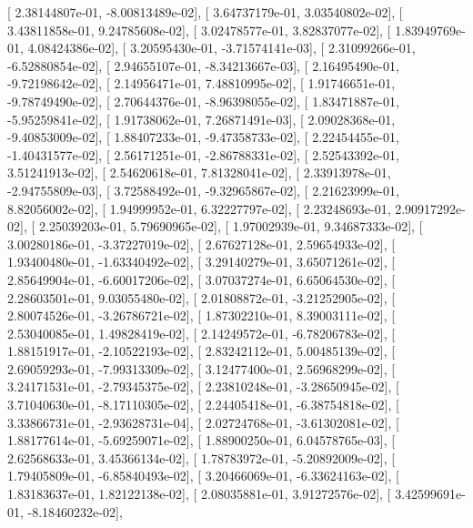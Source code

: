 \documentclass{article}
\begin{document}
       [  2.38144807e-01,  -8.00813489e-02],
       [  3.64737179e-01,   3.03540802e-02],
       [  3.43811858e-01,   9.24785608e-02],
       [  3.02478577e-01,   3.82837077e-02],
       [  1.83949769e-01,   4.08424386e-02],
       [  3.20595430e-01,  -3.71574141e-03],
       [  2.31099266e-01,  -6.52880854e-02],
       [  2.94655107e-01,  -8.34213667e-03],
       [  2.16495490e-01,  -9.72198642e-02],
       [  2.14956471e-01,   7.48810995e-02],
       [  1.91746651e-01,  -9.78749490e-02],
       [  2.70644376e-01,  -8.96398055e-02],
       [  1.83471887e-01,  -5.95259841e-02],
       [  1.91738062e-01,   7.26871491e-03],
       [  2.09028368e-01,  -9.40853009e-02],
       [  1.88407233e-01,  -9.47358733e-02],
       [  2.22454455e-01,  -1.40431577e-02],
       [  2.56171251e-01,  -2.86788331e-02],
       [  2.52543392e-01,   3.51241913e-02],
       [  2.54620618e-01,   7.81328041e-02],
       [  2.33913978e-01,  -2.94755809e-03],
       [  3.72588492e-01,  -9.32965867e-02],
       [  2.21623999e-01,   8.82056002e-02],
       [  1.94999952e-01,   6.32227797e-02],
       [  2.23248693e-01,   2.90917292e-02],
       [  2.25039203e-01,   5.79690965e-02],
       [  1.97002939e-01,   9.34687333e-02],
       [  3.00280186e-01,  -3.37227019e-02],
       [  2.67627128e-01,   2.59654933e-02],
       [  1.93400480e-01,  -1.63340492e-02],
       [  3.29140279e-01,   3.65071261e-02],
       [  2.85649904e-01,  -6.60017206e-02],
       [  3.07037274e-01,   6.65064530e-02],
       [  2.28603501e-01,   9.03055480e-02],
       [  2.01808872e-01,  -3.21252905e-02],
       [  2.80074526e-01,  -3.26786721e-02],
       [  1.87302210e-01,   8.39003111e-02],
       [  2.53040085e-01,   1.49828419e-02],
       [  2.14249572e-01,  -6.78206783e-02],
       [  1.88151917e-01,  -2.10522193e-02],
       [  2.83242112e-01,   5.00485139e-02],
       [  2.69059293e-01,  -7.99313309e-02],
       [  3.12477400e-01,   2.56968299e-02],
       [  3.24171531e-01,  -2.79345375e-02],
       [  2.23810248e-01,  -3.28650945e-02],
       [  3.71040630e-01,  -8.17110305e-02],
       [  2.24405418e-01,  -6.38754818e-02],
       [  3.33866731e-01,  -2.93628731e-04],
       [  2.02724768e-01,  -3.61302081e-02],
       [  1.88177614e-01,  -5.69259071e-02],
       [  1.88900250e-01,   6.04578765e-03],
       [  2.62568633e-01,   3.45366134e-02],
       [  1.78783972e-01,  -5.20892009e-02],
       [  1.79405809e-01,  -6.85840493e-02],
       [  3.20466069e-01,  -6.33624163e-02],
       [  1.83183637e-01,   1.82122138e-02],
       [  2.08035881e-01,   3.91272576e-02],
       [  3.42599691e-01,  -8.18460232e-02],
\end{document}
